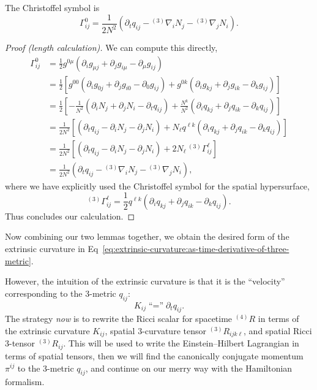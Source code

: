 \begin{lemma}
  The Christoffel symbol is
  \begin{equation}
\Gamma^{0}_{ij} = \frac{1}{2N^{2}}(\partial_{t}q_{ij} - {{}^{(3)}}\nabla_{i}N_{j} - {{}^{(3)}}\nabla_{j}N_{i}).
  \end{equation}
\end{lemma}
\begin{proof}[Proof (length calculation)]
  We can compute this directly,
  \begin{subequations}
    \begin{align}
\Gamma^{0}_{ij} &= \frac{1}{2} g^{0\mu}(\partial_{i}g_{\mu j} + \partial_{j}g_{i\mu} - \partial_{\mu} g_{ij}) \\
        &= \frac{1}{2}\left[ g^{00}(\partial_{i}g_{0j} + \partial_{j}g_{i0} - \partial_{0} g_{ij}) + g^{0k}(\partial_{i}g_{kj} + \partial_{j}g_{ik} - \partial_{k} g_{ij})  \right] \\
        &= \frac{1}{2}\left[ -\frac{1}{N^{2}} (\partial_{i}N_{j}+ \partial_{j}N_{i}- \partial_{t} q_{ij}) + \frac{N^{k}}{N^{2}} (\partial_{i}q_{kj} + \partial_{j}q_{ik} - \partial_{k} q_{ij}) \right] \\
        &= \frac{1}{2N^{2}}\left[ (\partial_{t} q_{ij} - \partial_{i}N_{j}- \partial_{j}N_{i}) + N_{\ell} q^{\ell k} (\partial_{i}q_{kj} + \partial_{j}q_{ik} - \partial_{k} q_{ij}) \right] \\
        &= \frac{1}{2N^{2}}\left[ (\partial_{t} q_{ij} - \partial_{i} N_{j} - \partial_{j}N_{i}) + 2 N_{\ell} \,{{}^{(3)}}\Gamma^{\ell}_{ij} \right] \\
        &= \frac{1}{2N^{2}} \left(\partial_{t} q_{ij} - {{}^{(3)}\nabla}_{i}N_{j}- {{}^{(3)}\nabla}_{j}N_{i}\right),
    \end{align}
  \end{subequations}
  where we have explicitly used the Christoffel symbol for the spatial hypersurface,
  \begin{equation}
    {{}^{(3)}}\Gamma^{\ell}_{ij} = \frac{1}{2}q^{\ell k}(\partial_{i}q_{kj} + \partial_{j}q_{ik} - \partial_{k}q_{ij}).
  \end{equation}
  Thus concludes our calculation.
\end{proof}

Now combining our two lemmas together, we obtain the desired form of the
extrinsic curvature in Eq~\eqref{eq:extrinsic-curvature:as-time-derivative-of-three-metric}.

However, the intuition of the extrinsic curvature is that it is the
``velocity'' corresponding to the 3-metric $q_{ij}$:
\begin{equation}
\boxed{K_{ij}\mathrel{\mbox{``=''}}\partial_{t}q_{ij}.}
\end{equation}
The strategy
\emph{now} is to rewrite the Ricci scalar for spacetime ${}^{(4)}R$ in
terms of the extrinsic curvature $K_{ij}$, spatial 3-curvature tensor
${}^{(3)}R_{ijk\ell}$, and spatial Ricci 3-tensor ${}^{(3)}R_{ij}$. This
will be used to write the Einstein--Hilbert Lagrangian in terms of
spatial tensors, then we will find the canonically conjugate momentum
$\pi^{ij}$ to the 3-metric $q_{ij}$, and continue on our merry way with
the Hamiltonian formalism.

